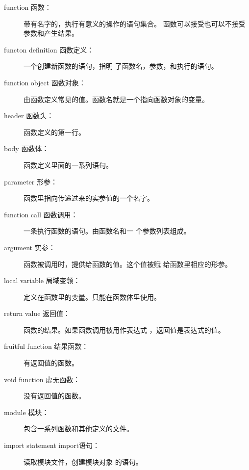 \begin{description}

\item[function 函数：] 带有名字的，执行有意义的操作的语句集合。
函数可以接受也可以不接受参数和产生结果。


\item[functon definition 函数定义：] 一个创建新函数的语句，指明
了函数名，参数，和执行的语句。

\item[function object 函数对象：] 由函数定义常见的值。函数名就是一个指向函数对象的变量。

\item[header 函数头：] 函数定义的第一行。

\item[body 函数体：] 函数定义里面的一系列语句。

\item[parameter 形参：] 函数里指向传递过来的实参值的一个名字。

\item[function call 函数调用：]一条执行函数的语句。由函数名和一
个参数列表组成。

\item[argument 实参：] 函数被调用时，提供给函数的值。这个值被赋
给函数里相应的形参。

\item[local variable 局域变领：]定义在函数里的变量。只能在函数体里使用。

\item[return value 返回值：]函数的结果。如果函数调用被用作表达式
，返回值是表达式的值。

\item[fruitful function 结果函数：]有返回值的函数。

\item[void function 虚无函数：]没有返回值的函数。

\item[module 模块：] 包含一系列函数和其他定义的文件。

\item[import statement import语句：] 读取模块文件，创建模块对象
的语句。



\end{description}

